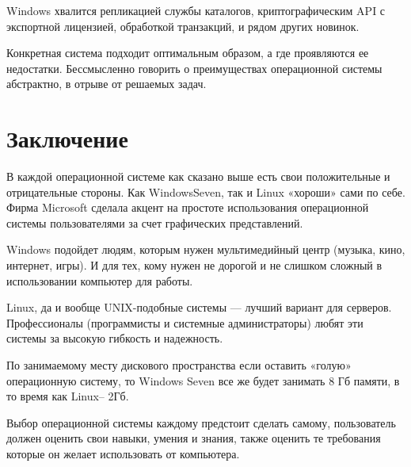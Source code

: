 \documentclass[14pt]{article}
\begin{document}
    Windows хвалится репликацией службы каталогов, криптографическим API с экспортной лицензией, обработкой транзакций, и рядом других новинок.

    Конкретная система подходит оптимальным образом, а где проявляются ее недостатки. Бессмысленно говорить о преимуществах операционной системы абстрактно, в отрыве от решаемых задач.

    \newpage
    \section{Заключение}

    В каждой операционной системе как сказано выше есть свои положительные и отрицательные стороны. Как WindowsSeven, так и Linux «хороши» сами по себе. Фирма Microsoft сделала акцент на простоте использования операционной системы пользователями за счет графических представлений.

    Windows подойдет людям, которым нужен мультимедийный центр (музыка, кино, интернет, игры). И для тех, кому нужен не дорогой и не слишком сложный в использовании компьютер для работы.

    Linux, да и вообще UNIX-подобные системы --- лучший вариант для серверов. Профессионалы (программисты и системные администраторы) любят эти системы за высокую гибкость и надежность.

    По занимаемому месту дискового пространства если оставить «голую» операционную систему, то Windows Seven все же будет занимать 8 Гб памяти, в то время как Linux– 2Гб.

    Выбор операционной системы каждому предстоит сделать самому, пользователь должен оценить свои навыки, умения и знания, также оценить те требования которые он желает использовать от компьютера.

    \newpage
\end{document}
